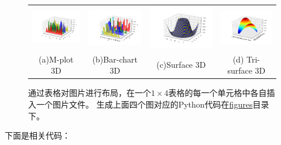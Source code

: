 \documentclass[UTF8]{ctexart}
\numberwithin{equation}{section} %
\numberwithin{table}{section} %
\begin{document}
\begin{figure}[!h]
\centering
  \begin{tabular}{@{}cccc@{}}
    \includegraphics[width=.25\textwidth]{figures/mplot3d}  &
    \includegraphics[width=.25\textwidth]{figures/bar3d}  &
    \includegraphics[width=.25\textwidth]{figures/surface3d} &
    \includegraphics[width=.25\textwidth]{figures/trisurf3d} \\
    (a)M-plot 3D & (b)Bar-chart 3D & 
    (c)Surface 3D & (d) Tri-surface 3D \\
  \end{tabular}
  \caption{通过表格对图片进行布局，在一个$1\times4$表格的每一个单元格中各自插入一个图片文件。
  生成上面四个图对应的Python代码在\href{https://github.com/zeakey/shu-thesis/tree/master/figures}{figures}目录下。}
  \label{fig:fig3d}
\end{figure}
下面是相关代码：
\end{document}
